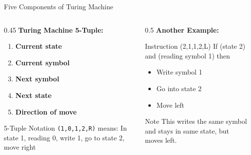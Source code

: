 \documentclass[aspectratio=169]{beamer}
\begin{document}
\begin{frame}{Five Components of Turing Machine}
    \begin{columns}
        \begin{column}{0.45\textwidth}
            \textbf{Turing Machine 5-Tuple:}
            \begin{enumerate}
                \item \textcolor{turingcolor}{\textbf{Current state}}
                \item \textcolor{turingcolor}{\textbf{Current symbol}}
                \item \textcolor{turingcolor}{\textbf{Next symbol}}
                \item \textcolor{turingcolor}{\textbf{Next state}}
                \item \textcolor{turingcolor}{\textbf{Direction of move}}
            \end{enumerate}
            
            \vspace{0.5cm}
            \begin{exampleblock}{5-Tuple Notation}
                \texttt{(1,0,1,2,R)} means:
                \small{In state 1, reading 0, write 1, go to state 2, move right}
            \end{exampleblock}
        \end{column}
        \begin{column}{0.5\textwidth}
            \textbf{Another Example:}
            \begin{block}{Instruction (2,1,1,2,L)}
                If (state 2) and (reading symbol 1) then
                \begin{itemize}
                    \item Write symbol 1
                    \item Go into state 2  
                    \item Move left
                \end{itemize}
            \end{block}
            
            \vspace{0.3cm}
            \begin{alertblock}{Note}
                This writes the same symbol and stays in same state, but moves left.
            \end{alertblock}
        \end{column}
    \end{columns}
\end{frame}
\end{document}
